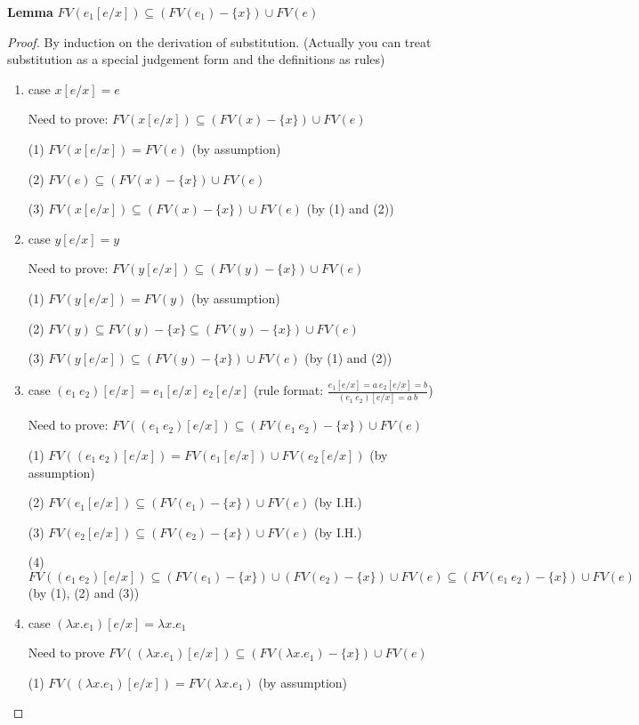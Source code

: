 \documentclass{article}
\begin{document}
\textbf{Lemma}	$FV(e_1[e/x]) \subseteq (FV(e_1) - \{x\}) \cup FV(e)$


\begin{proof}
	By induction on the derivation of substitution. (Actually you can treat substitution as a special judgement form and the definitions as rules)
	\begin{enumerate}
		\item case $x[e/x] = e$
		
		Need to prove: $FV(x[e/x]) \subseteq (FV(x)-\{x\}) \cup FV(e)$
		
		(1) $FV(x[e/x])=FV(e)$ (by assumption)
		
		(2) $FV(e) \subseteq (FV(x) - \{x\}) \cup FV(e)$
		
		(3) $FV(x[e/x]) \subseteq (FV(x)-\{x\}) \cup FV(e)$ (by (1) and (2))
		
		\item case $y[e/x] = y$
		
		Need to prove: $FV(y[e/x]) \subseteq (FV(y)-\{x\}) \cup FV(e)$
		
		(1) $FV(y[e/x])=FV(y)$ (by assumption)
		
		(2) $FV(y) \subseteq FV(y)-\{x\} \subseteq (FV(y)-\{x\}) \cup FV(e)$
		
		(3) $FV(y[e/x]) \subseteq (FV(y)-\{x\}) \cup FV(e)$ (by (1) and (2))
		
		\item case $(e_1\ e_2)[e/x] = e_1[e/x]\ e_2[e/x]$ (rule format: $\frac{e_1[e/x]=a\ e_2[e/x]=b}{(e_1\ e_2)[e/x] = a\ b}$)
		
		Need to prove: $FV((e_1\ e_2)[e/x]) \subseteq (FV(e_1\ e_2) -\{x\}) \cup FV(e)$
		
		(1) $FV((e_1\ e_2)[e/x]) = FV(e_1[e/x]) \cup FV(e_2[e/x])$ (by assumption)
		
		(2) $FV(e_1[e/x]) \subseteq (FV(e_1) -\{x\}) \cup FV(e)$ (by I.H.)
		
		(3) $FV(e_2[e/x]) \subseteq (FV(e_2) -\{x\}) \cup FV(e)$ (by I.H.)
		
		(4) $FV((e_1\ e_2)[e/x]) \subseteq (FV(e_1) -\{x\}) \cup (FV(e_2) -\{x\}) \cup FV(e) \subseteq (FV(e_1\ e_2) -\{x\}) \cup FV(e)$ (by (1), (2) and (3))
		
		\item case $(\lambda x.e_1)[e/x] = \lambda x.e_1$
		
		Need to prove $FV((\lambda x.e_1)[e/x]) \subseteq (FV(\lambda x.e_1) -\{x\}) \cup FV(e)$
		
		(1) $FV((\lambda x.e_1)[e/x]) = FV(\lambda x.e_1)$ (by assumption)
		

\end{enumerate}
\end{proof}
\end{document}

